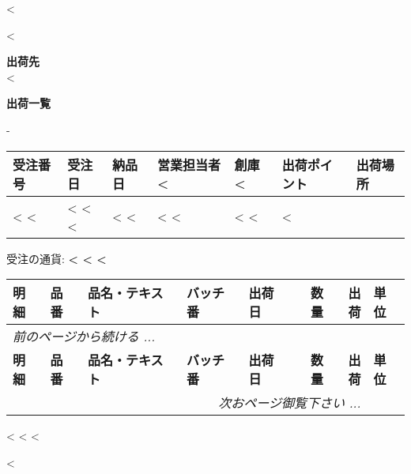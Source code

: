 <%

\begin{CJK}{UTF8}{arialuni}

\vspace*{-3.3cm}
<%
\vspace*{0.5cm}

\parbox[t]{.80\textwidth}{
\textbf{出荷先} \\
<%
}

\vspace{1.2cm}

\centerline{\large\bf{出荷一覧}}
\normalsize

\vspace{0.5cm}
-
\vspace{0.2cm}

\begin{tabularx}{\textwidth}{*{7}{|X}|} \hline
  \textbf{受注番号} & \textbf{受注日} & \textbf{納品日} & \textbf{営業担当者}
  <%
  & \textbf{創庫}
  <%
  & \textbf{出荷ポイント} & \textbf{出荷場所} \\ [0.5em]
  \hline
  
  <%
  <%
  & <%
  <%
  <%
  & <%
  <%
  & <%
  <%
  & <%
  <%
  & <%
  \hline
\end{tabularx}

\vspace{0.5cm}
	受注の通貨: \textbf{<%
<%
<%
}
\vspace{0.5cm}  

\begin{longtable} {|ll p{4.5cm} @{\extracolsep\fill} llrrl|} \hline
\xstrut
  \textbf{明細} & \textbf{品番} & \textbf{品名・テキスト} & \textbf{バッチ番} & 
  \textbf{出荷日}  & \textbf{数量} & \textbf{出荷} & \textbf{単位} \\
  \hline
\endfirsthead
  \multicolumn{7}{l}{\emph{前のページから続ける ...}} \\
  \hline
  \textbf{明細} & \textbf{品番} & \textbf{品名・テキスト} & \textbf{バッチ番} & 
  \textbf{出荷日}  & \textbf{数量} & \textbf{出荷} & \textbf{単位} \\  
  \hline
\endhead
   \hline \multicolumn{7}{r}{\emph{次おページ御覧下さい ...}}
\endfoot
  \hline
\endlastfoot
<%
  <%
  <%
<%
\end{longtable}

\vspace{1.5cm}

\parbox[t]{.80\textwidth}{
<%
<%
<%
}

\vfill
<%
\end{CJK}

